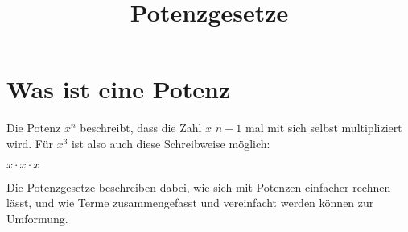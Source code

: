 \documentclass[10pt,a4paper]{article}
\begin{document}
\setlength{\parindent}{0cm}

\title{Potenzgesetze}

\makeatletter
\def\@maketitle{%
  \newpage
  \null
  \vskip 2em%
  \begin{center}%
  \let \footnote \thanks
    {\Huge\bfseries\@title \par}%
    \vskip 1.5em%
    {\large
      \lineskip .5em%
      \begin{tabular}[t]{c}%
        \@author
      \end{tabular}\par}%
    \vskip 1em%
    {\large \@date}%
  \end{center}%
  \par
  \vskip 1.5em}
\makeatother

\author{}
\date{}

\maketitle

\section*{Was ist eine Potenz}
Die Potenz $x^n$ beschreibt, dass die Zahl $x$ $n-1$ mal mit sich 
selbst multipliziert wird. Für $x^3$ ist also auch diese Schreibweise möglich:

$x \cdot x \cdot x$

Die Potenzgesetze beschreiben dabei, wie sich mit Potenzen einfacher rechnen lässt,
und wie Terme zusammengefasst und vereinfacht werden können zur Umformung.
\end{document}
